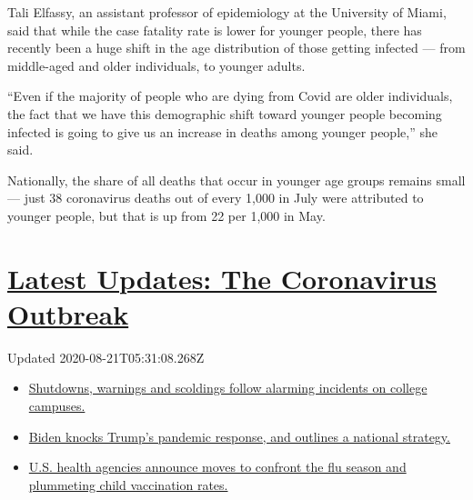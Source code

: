 Tali Elfassy, an assistant professor of epidemiology at the University
of Miami, said that while the case fatality rate is lower for younger
people, there has recently been a huge shift in the age distribution of
those getting infected --- from middle-aged and older individuals, to
younger adults.

``Even if the majority of people who are dying from Covid are older
individuals, the fact that we have this demographic shift toward younger
people becoming infected is going to give us an increase in deaths among
younger people,'' she said.

Nationally, the share of all deaths that occur in younger age groups
remains small --- just 38 coronavirus deaths out of every 1,000 in July
were attributed to younger people, but that is up from 22 per 1,000 in
May.

\hypertarget{latest-updates-the-coronavirus-outbreak}{%
\section{\texorpdfstring{\href{https://www.nytimes3xbfgragh.onion/2020/08/20/world/coronavirus-covid.html?action=click\&pgtype=Article\&state=default\&region=MAIN_CONTENT_1\&context=storylines_live_updates}{Latest
Updates: The Coronavirus
Outbreak}}{Latest Updates: The Coronavirus Outbreak}}\label{latest-updates-the-coronavirus-outbreak}}

Updated 2020-08-21T05:31:08.268Z

\begin{itemize}
\tightlist
\item
  \href{https://www.nytimes3xbfgragh.onion/2020/08/20/world/coronavirus-covid.html?action=click\&pgtype=Article\&state=default\&region=MAIN_CONTENT_1\&context=storylines_live_updates\#link-68774d88}{Shutdowns,
  warnings and scoldings follow alarming incidents on college campuses.}
\item
  \href{https://www.nytimes3xbfgragh.onion/2020/08/20/world/coronavirus-covid.html?action=click\&pgtype=Article\&state=default\&region=MAIN_CONTENT_1\&context=storylines_live_updates\#link-26b58724}{Biden
  knocks Trump's pandemic response, and outlines a national strategy.}
\item
  \href{https://www.nytimes3xbfgragh.onion/2020/08/20/world/coronavirus-covid.html?action=click\&pgtype=Article\&state=default\&region=MAIN_CONTENT_1\&context=storylines_live_updates\#link-4e542da3}{U.S.
  health agencies announce moves to confront the flu season and
  plummeting child vaccination rates.}
\end{itemize}

